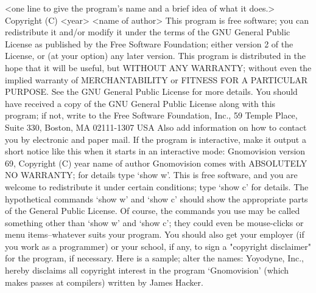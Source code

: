 \begin{DoxyCodeInclude}
    <one line to give the program\textcolor{stringliteral}{'s name and a brief idea of what it does.>}
\textcolor{stringliteral}{    Copyright (C) <year>  <name of author>}
\textcolor{stringliteral}{}
\textcolor{stringliteral}{    This program is free software; you can redistribute it and/or modify}
\textcolor{stringliteral}{    it under the terms of the GNU General Public License as published by}
\textcolor{stringliteral}{    the Free Software Foundation; either version 2 of the License, or}
\textcolor{stringliteral}{    (at your option) any later version.}
\textcolor{stringliteral}{}
\textcolor{stringliteral}{    This program is distributed in the hope that it will be useful,}
\textcolor{stringliteral}{    but WITHOUT ANY WARRANTY; without even the implied warranty of}
\textcolor{stringliteral}{    MERCHANTABILITY or FITNESS FOR A PARTICULAR PURPOSE.  See the}
\textcolor{stringliteral}{    GNU General Public License for more details.}
\textcolor{stringliteral}{}
\textcolor{stringliteral}{    You should have received a copy of the GNU General Public License}
\textcolor{stringliteral}{    along with this program; if not, write to the Free Software}
\textcolor{stringliteral}{    Foundation, Inc., 59 Temple Place, Suite 330, Boston, MA  02111-1307  USA}
\textcolor{stringliteral}{}
\textcolor{stringliteral}{}
\textcolor{stringliteral}{Also add information on how to contact you by electronic and paper mail.}
\textcolor{stringliteral}{}
\textcolor{stringliteral}{If the program is interactive, make it output a short notice like this}
\textcolor{stringliteral}{when it starts in an interactive mode:}
\textcolor{stringliteral}{}
\textcolor{stringliteral}{    Gnomovision version 69, Copyright (C) year  name of author}
\textcolor{stringliteral}{    Gnomovision comes with ABSOLUTELY NO WARRANTY; for details type `show w'}.
    This is free software, and you are welcome to redistribute it
    under certain conditions; type `show c\textcolor{stringliteral}{' for details.}
\textcolor{stringliteral}{}
\textcolor{stringliteral}{The hypothetical commands `show w'} and `show c\textcolor{stringliteral}{' should show the appropriate}
\textcolor{stringliteral}{parts of the General Public License.  Of course, the commands you use may}
\textcolor{stringliteral}{be called something other than `show w'} and `show c\textcolor{stringliteral}{'; they could even be}
\textcolor{stringliteral}{mouse-clicks or menu items--whatever suits your program.}
\textcolor{stringliteral}{}
\textcolor{stringliteral}{You should also get your employer (if you work as a programmer) or your}
\textcolor{stringliteral}{school, if any, to sign a "copyright disclaimer" for the program, if}
\textcolor{stringliteral}{necessary.  Here is a sample; alter the names:}
\textcolor{stringliteral}{}
\textcolor{stringliteral}{  Yoyodyne, Inc., hereby disclaims all copyright interest in the program}
\textcolor{stringliteral}{  `Gnomovision'} (which makes passes at compilers) written by James Hacker.


\end{DoxyCodeInclude}
